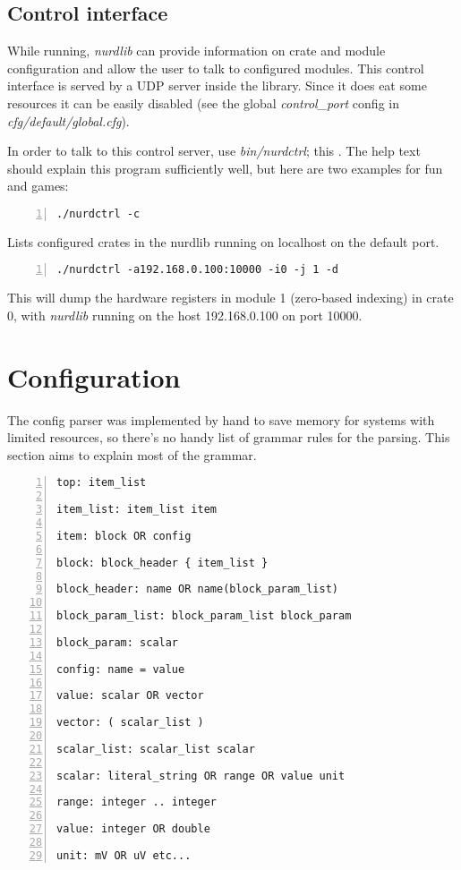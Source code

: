 \documentclass{article}
\begin{document}
\subsection{Control interface}

While running, \emph{nurdlib} can provide information on crate and module
configuration and allow the user to talk to configured modules. This control
interface is served by a UDP server inside the library. Since it does eat some
resources it can be easily disabled (see the global \emph{control\_port}
config in \emph{cfg/default/global.cfg}).

In order to talk to this control server, use \emph{bin/nurdctrl}; this . The
help text should explain this program sufficiently well, but here are two
examples for fun and games:
\begin{Verbatim}[frame=single,numbers=left]
./nurdctrl -c
\end{Verbatim}
Lists configured crates in the nurdlib running on localhost on the default
port.
\begin{Verbatim}[frame=single,numbers=left]
./nurdctrl -a192.168.0.100:10000 -i0 -j 1 -d
\end{Verbatim}
This will dump the hardware registers in module 1 (zero-based indexing) in
crate 0, with \emph{nurdlib} running on the host 192.168.0.100 on port 10000.




\section{Configuration}

The config parser was implemented by hand to save memory for systems with
limited resources, so there's no handy list of grammar rules for the parsing.
This section aims to explain most of the grammar.

\begin{Verbatim}[frame=single,numbers=left]
top: item_list

item_list: item_list item

item: block OR config

block: block_header { item_list }

block_header: name OR name(block_param_list)

block_param_list: block_param_list block_param

block_param: scalar

config: name = value

value: scalar OR vector

vector: ( scalar_list )

scalar_list: scalar_list scalar

scalar: literal_string OR range OR value unit

range: integer .. integer

value: integer OR double

unit: mV OR uV etc...
\end{Verbatim}
\end{document}
